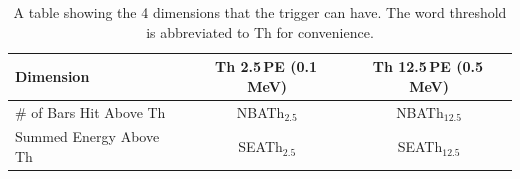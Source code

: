 \begin{table}[!h]
\centering
\begin{tabular}{lcc}  
\toprule
Dimension               & Th 2.5\,PE (0.1\,MeV) & Th 12.5\,PE (0.5\,MeV)\\
\midrule
\# of Bars Hit Above Th &  NBATh$_{2.5}$        & NBATh$_{12.5}$\\
Summed Energy Above Th  &  SEATh$_{2.5}$        & SEATh$_{12.5}$\\
\bottomrule  
\end{tabular}
\caption{A table showing the 4 dimensions that the trigger can have. The word threshold is abbreviated to Th for convenience.}
\label{tab:triggerDims}
\end{table}


